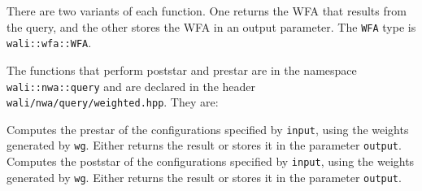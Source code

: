 There are two variants of each function. One returns the WFA that results from
the query, and the other stores the WFA in an output parameter. The
\texttt{WFA} type is \texttt{wali::wfa::WFA}.

The functions that perform poststar and prestar are in the namespace
\texttt{wali::nwa::query} and are declared in the header
\texttt{wali/nwa/query/weighted.hpp}. They are:
\begin{functionlist}
    Computes the prestar of the configurations specified by
    \texttt{input}, using the weights generated by \texttt{wg}. Either
    returns the result or stores it in the parameter \texttt{output}.
    Computes the poststar of the configurations specified by
    \texttt{input}, using the weights generated by \texttt{wg}. Either
    returns the result or stores it in the parameter \texttt{output}.
\end{functionlist}
